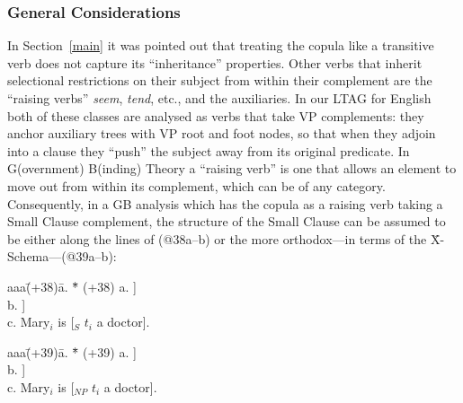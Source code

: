 \subsubsection{General Considerations}

In Section~\ref{main} it was pointed out that treating the copula like a
transitive verb does not capture its ``inheritance'' properties.
Other verbs that inherit selectional restrictions on their subject from
within their complement are the ``raising verbs'' {\em seem\/}, {\em
tend\/}, etc., and the auxiliaries.  In our LTAG for English both of
these classes are analysed as verbs that take VP complements:  they 
anchor auxiliary trees with VP root and foot nodes, so that when they
adjoin into a clause they ``push'' the subject away from its original
predicate. In G(overnment) B(inding) Theory a ``raising verb'' is one
that allows an element to move out from within its complement, which can
be of any category. Consequently, in a GB analysis which has the copula
as a raising verb taking a Small Clause complement, the structure of the
Small Clause can be assumed to be either along the lines of (@38a--b) or
the more orthodox---in terms of the \={X}-Schema---(@39a--b):
\begin{tabbing}
aaa\=(+38)\= a. \= *\= \kill
   \>(+38)\> a. \>  \> [$_{S}$ [$_{NP}$ Mary] [$_{NP}$ a doctor]]   \\
   \>     \> b. \>  \> [$_{S}$ [$_{NP}$ Mary] [$_{AP}$ decadent]]   \\
   \>  \>    c. \>  \> Mary$_{i}$ is [$_{S}$ $t_{i}$ a doctor]. 
\end{tabbing}
\begin{tabbing}
aaa\=(+39)\= a. \= *\= \kill
   \>(+39)\> a. \>  \> [$_{NP}$ [$_{NP}$ Mary] [$_{NP}$ a doctor]]   \\
   \>  \>    b. \>  \> [$_{AP}$ [$_{NP}$ Mary] [$_{AP}$ decadent]]   \\
   \>  \>    c. \>  \> Mary$_{i}$ is [$_{NP}$ $t_{i}$ a doctor]. 
\end{tabbing}

